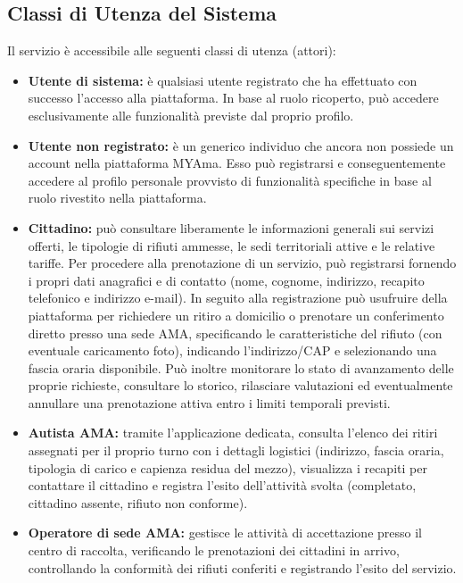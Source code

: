 \subsection{Classi di Utenza del Sistema}
Il servizio è accessibile alle seguenti classi di utenza (attori):
\begin{itemize}[leftmargin=*]
    \item \textbf{Utente di sistema:} è qualsiasi utente registrato che ha effettuato con successo l'accesso alla piattaforma. In base al ruolo ricoperto, può accedere esclusivamente alle funzionalità previste dal proprio profilo.
    
    \item \textbf{Utente non registrato:} è un generico individuo che ancora non possiede un account nella piattaforma MYAma. Esso può registrarsi e conseguentemente accedere al profilo personale provvisto di funzionalità specifiche in base al ruolo rivestito nella piattaforma.
    
    \item \textbf{Cittadino:} può consultare liberamente le informazioni generali sui servizi offerti, le tipologie di rifiuti ammesse, le sedi territoriali attive e le relative tariffe. Per procedere alla prenotazione di un servizio, può registrarsi fornendo i propri dati anagrafici e di contatto (nome, cognome, indirizzo, recapito telefonico e indirizzo e-mail). In seguito alla registrazione può usufruire della piattaforma per richiedere un ritiro a domicilio o prenotare un conferimento diretto presso una sede AMA, specificando le caratteristiche del rifiuto (con eventuale caricamento foto), indicando l'indirizzo/CAP e selezionando una fascia oraria disponibile. Può inoltre monitorare lo stato di avanzamento delle proprie richieste, consultare lo storico, rilasciare valutazioni ed eventualmente annullare una prenotazione attiva entro i limiti temporali previsti.
    
    \item \textbf{Autista AMA:} tramite l'applicazione dedicata, consulta l'elenco dei ritiri assegnati per il proprio turno con i dettagli logistici (indirizzo, fascia oraria, tipologia di carico e capienza residua del mezzo), visualizza i recapiti per contattare il cittadino e registra l'esito dell'attività svolta (completato, cittadino assente, rifiuto non conforme).
    
    \item \textbf{Operatore di sede AMA:} gestisce le attività di accettazione presso il centro di raccolta, verificando le prenotazioni dei cittadini in arrivo, controllando la conformità dei rifiuti conferiti e registrando l'esito del servizio.
    

\end{itemize}
